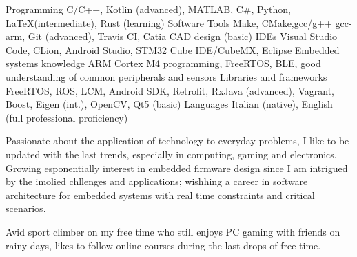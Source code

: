 \vspace*{-16pt}
\begin{cventries}
    
    \begin{cvskills}
        \cvskill
        {Programming}
        {C/C++, Kotlin (advanced), MATLAB, C\#, Python, \LaTeX (intermediate), Rust (learning)}
        \cvskill
        {Software Tools}
        {Make, CMake,gcc/g++ gcc-arm, Git (advanced), Travis CI, Catia CAD design (basic)}
        \cvskill
        {IDEs}
        {Visual Studio Code, CLion, Android Studio, STM32 Cube IDE/CubeMX, Eclipse}
        \cvskill
        {Embedded systems knowledge}
        {ARM Cortex M4 programming, FreeRTOS, BLE, good understanding \linebreak of common peripherals and sensors}
        \cvskill
        {Libraries and frameworks}
        {FreeRTOS, ROS, LCM, Android SDK, Retrofit, RxJava (advanced), Vagrant, Boost, Eigen (int.), \linebreak OpenCV, Qt5 (basic)}
        \cvskill
        {Languages}
        {Italian (native), English (full professional proficiency)}
    \end{cvskills}

\end{cventries}

\begin{cvparagraph}
   Passionate about the application of technology to everyday problems, I like to be updated with the last trends, especially in computing, gaming and electronics. 
   Growing esponentially interest in embedded firmware design since I am intrigued by the imolied chllenges and applications; wishhing a career in software architecture for embedded systems with real time constraints and critical scenarios.

   Avid sport climber on my free time who still enjoys PC gaming with friends on rainy days, likes to follow online courses during the last drops of free time.
\end{cvparagraph}